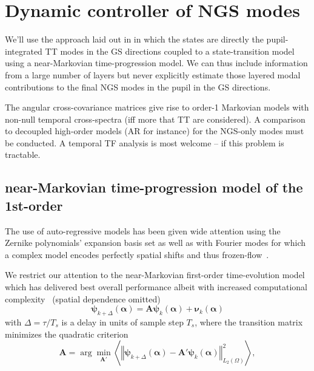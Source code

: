 \documentclass[a4paper,12pt]{article}
\newcommand{\average}[1]{\left \langle {#1} \right \rangle}
\newcommand{\0}{\mathsf{0}} %
\newcommand{\alphavec}{{\boldsymbol{\alpha}}}
\newcommand{\phivec}{{\boldsymbol{\psi}}}
\newcommand{\Asa}{{\mathbf{A}}}
\begin{document}
\section{ Dynamic controller of NGS modes}
We'll use the approach laid out in \cite{correia15} in which the
states are directly the pupil-integrated TT modes in the GS directions
coupled to a state-transition model using a near-Markovian
time-progression model. We can thus include information from a large
number of layers but never explicitly estimate those layered modal
contributions to the final NGS modes in the pupil in the GS
directions. 

The angular cross-covariance matrices give rise to order-1 Markovian
models with non-null temporal cross-spectra (iff more that TT are considered). A comparison to decoupled
high-order models (AR for instance) for the NGS-only modes must be
conducted. A temporal TF analysis is most welcome -- if this problem
is tractable. 

\subsection{near-Markovian time-progression model of the 1st-order }\label{sec:nearMarkovModel}
The use of auto-regressive models has been given wide attention using
the Zernike polynomials' expansion basis set \cite{petit09, sivo14} as
well as with Fourier modes for which a complex model encodes perfectly
spatial shifts and thus frozen-flow~\cite{poyneer08}. %

We restrict our attention to the near-Markovian first-order
time-evolution model \cite{gavel02a} which has delivered best overall
performance albeit with increased computational
complexity~\cite{piatrou07, correia14, jackson15} (spatial dependence omitted)
\begin{equation}\label{eq:AR1model}
  \phivec_{k+\Delta}(\alphavec) = \Asa \phivec_{k} (\alphavec) + \boldsymbol{\nu}_k (\alphavec)
\end{equation}  
with  $\Delta = \tau/T_s$ is a delay in units of sample step $T_s$, where the transition matrix minimizes the quadratic criterion \cite{correia14}
\begin{equation}\label{eq:Asa}
 \Asa = \arg\min_{\Asa'}\average{\left\Vert\phivec_{k+\Delta} (\alphavec)- \Asa'  \phivec_k(\alphavec) \right \Vert^2_{L_2(\Omega)}},
\end{equation}
\end{document}
